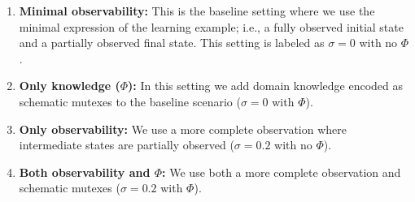 \documentclass{article}
\begin{document}
\begin{enumerate}
	\item \textbf{Minimal observability:} This is the baseline setting where we use the minimal expression of the learning example; i.e., a fully observed initial state and a partially observed final state. This setting is labeled as $\sigma = 0$ with no $\Phi$.
	\item \textbf{Only knowledge ($\Phi$):} In this setting we add domain knowledge encoded as schematic mutexes to the baseline scenario ($\sigma = 0$ with $\Phi$).
	\item \textbf{Only observability:} We use a more complete observation where intermediate states are partially observed ($\sigma = 0.2$ with no $\Phi$).
	\item \textbf{Both observability and $\Phi$:} We use both a more complete observation and schematic mutexes ($\sigma = 0.2$ with $\Phi$).
\end{enumerate}
\end{document}
